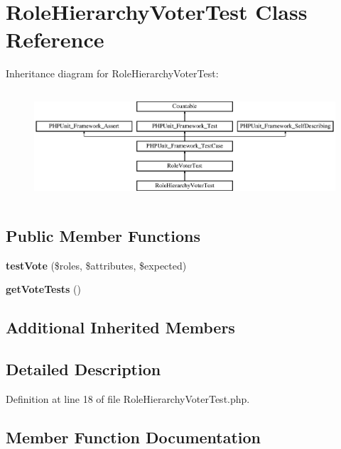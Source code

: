 \section{Role\+Hierarchy\+Voter\+Test Class Reference}
\label{class_symfony_1_1_component_1_1_security_1_1_core_1_1_tests_1_1_authorization_1_1_voter_1_1_role_hierarchy_voter_test}
Inheritance diagram for Role\+Hierarchy\+Voter\+Test\+:\begin{figure}[H]
\begin{center}
\leavevmode
\includegraphics[height=4.129793cm]{class_symfony_1_1_component_1_1_security_1_1_core_1_1_tests_1_1_authorization_1_1_voter_1_1_role_hierarchy_voter_test}
\end{center}
\end{figure}
\subsection*{Public Member Functions}
\begin{DoxyCompactItemize}
\item 
{\bf test\+Vote} (\$roles, \$attributes, \$expected)
\item 
{\bf get\+Vote\+Tests} ()
\end{DoxyCompactItemize}
\subsection*{Additional Inherited Members}


\subsection{Detailed Description}


Definition at line 18 of file Role\+Hierarchy\+Voter\+Test.\+php.



\subsection{Member Function Documentation}
